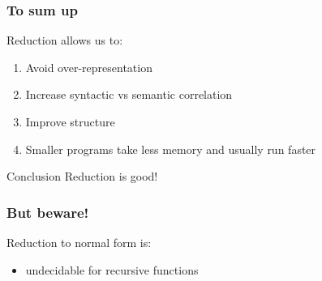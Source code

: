 \documentclass{beamer}
\begin{document}
\frame
{
  \frametitle{To sum up}
  
  Reduction allows us to:
  \begin{enumerate}
  \item Avoid \alert{over-representation}
  \item Increase \alert{syntactic vs semantic correlation}
  \item \alert{Improve structure}
  \item Smaller programs take \alert{less memory} and usually run faster
  \end{enumerate}


  \begin{beamerboxesrounded}{Conclusion}
    Reduction is good!
  \end{beamerboxesrounded}
}

\frame
{

  \frametitle{But beware!}
  
  Reduction to normal form is:
  \begin{itemize}
  \item<+-> undecidable for recursive functions
    

\end{itemize}}
\end{document}
